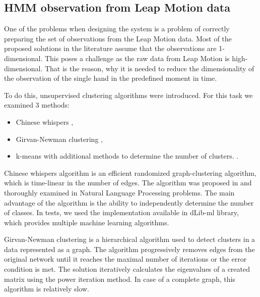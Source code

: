 \subsection{HMM observation from Leap Motion data}

One of the problems when designing the system is a problem of correctly preparing the set of observations from the Leap Motion data.
Most of the proposed solutions in the literature assume that the observations are 1-dimensional.
This poses a challenge as the raw data from Leap Motion is high-dimensional.
That is the reason, why it is needed to reduce the dimensionality of the observation of the single hand in the predefined moment in time.

To do this, unsupervised clustering algorithms were introduced. 
For this task we examined 3 methods:
\begin{itemize}
\item Chinese whispers \cite{CW1, CW2},
\item Girvan-Newman clustering \cite{Newman},
\item k-means with additional methods to determine the number of clusters. \cite{kmeans1, kmeans2}.
\end{itemize}

Chinese whispers algorithm is an efficient randomized graph-clustering algorithm, which is time-linear in the number of edges.
The algorithm was proposed in \cite{CW1} and thoroughly examined in Natural Language Processing problems. 
The main advantage of the algorithm is the ability to independently determine the number of classes. 
In tests, we used the implementation available in dLib-ml library\cite{dlib}, which provides multiple machine learning algorithms.

Girvan-Newman clustering is a hierarchical algorithm used to detect clusters in a data represented as a graph.
The algorithm progressively removes edges from the original network until it reaches the maximal number of iterations or the error condition is met.
The solution iteratively calculates the eigenvalues of a created matrix using the power iteration method. 
In case of a complete graph, this algorithm is relatively slow.

